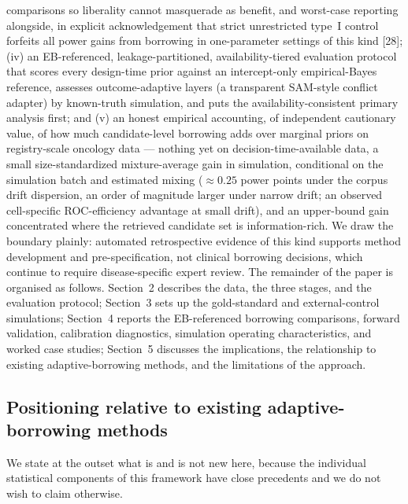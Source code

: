 \documentclass[11pt]{article}
\begin{document}
comparisons so liberality cannot masquerade as benefit, and worst-case
reporting alongside, in explicit acknowledgement that strict unrestricted
type~I control forfeits all power gains from borrowing in one-parameter
settings of this kind [28];
(iv) an EB-referenced, leakage-partitioned, availability-tiered evaluation
protocol that scores every design-time prior against an intercept-only
empirical-Bayes reference, assesses outcome-adaptive layers (a transparent
SAM-style conflict adapter) by known-truth simulation, and puts the
availability-consistent primary analysis first; and
(v) an honest empirical accounting, of independent cautionary value, of how
much candidate-level borrowing adds over marginal priors on registry-scale
oncology data --- nothing yet on decision-time-available data, a small
size-standardized mixture-average gain in simulation, conditional on
the simulation batch and estimated mixing ($\approx 0.25$
power points under the corpus drift dispersion, an order of magnitude
larger under narrow drift; an observed cell-specific ROC-efficiency
advantage at small drift), and an upper-bound gain
concentrated where the
retrieved candidate set is information-rich. We draw the
boundary plainly: automated retrospective evidence of this kind supports method
development and pre-specification, not clinical borrowing decisions, which
continue to require disease-specific expert review. The remainder of the paper
is organised as follows. Section~2 describes the data, the three stages, and
the evaluation protocol; Section~3 sets up the gold-standard and
external-control simulations; Section~4 reports the EB-referenced borrowing
comparisons, forward validation, calibration diagnostics, simulation operating
characteristics, and worked case studies; Section~5 discusses the
implications, the relationship to existing adaptive-borrowing methods, and the
limitations of the approach.


\subsection*{Positioning relative to existing adaptive-borrowing methods}

We state at the outset what is and is not new here, because the individual
statistical components of this framework have close precedents and we do not
wish to claim otherwise.
\end{document}
